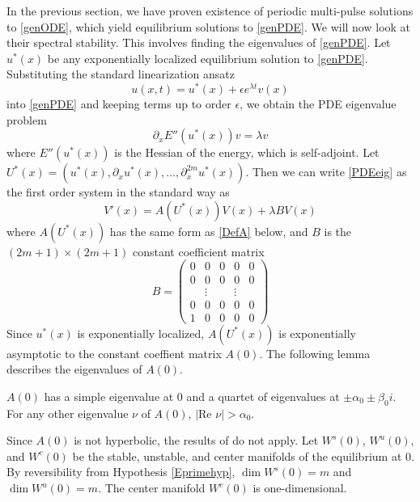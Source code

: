 \documentclass[thesis.tex]{subfiles}
\begin{document}
In the previous section, we have proven existence of periodic multi-pulse solutions to \eqref{genODE}, which yield equilibrium solutions to \eqref{genPDE}. We will now look at their spectral stability. This involves finding the eigenvalues of \eqref{genPDE}. Let $u^*(x)$ be any exponentially localized equilibrium solution to \eqref{genPDE}. Substituting the standard linearization ansatz 
\[
u(x, t) = u^*(x) + \epsilon e^{\lambda t}v(x)
\]
into \eqref{genPDE} and keeping terms up to order $\epsilon$, we obtain the PDE eigenvalue problem
\begin{equation}\label{PDEeig}
\partial_x E''(u^*(x)) v = \lambda v
\end{equation}
where $E''(u^*(x))$ is the Hessian of the energy, which is self-adjoint.  Let $U^*(x) = (u^*(x), \partial_x u^*(x), \dots, \partial_x^{2m}u^*(x))$. Then we can write \eqref{PDEeig} as the first order system in the standard way as
\begin{equation}\label{PDEeig2}
V'(x) = A(U^*(x))V(x) + \lambda B V(x)
\end{equation}
where $A(U^*(x))$ has the same form as \eqref{DefA} below, and $B$ is the $(2m+1) \times (2m+1)$ constant coefficient matrix
\begin{equation}\label{DefB}
B = \begin{pmatrix}0 & 0 & 0 & 0 & 0 \\0 & 0 & 0 & 0 & 0 \\  & 
\vdots & & \vdots & \\0 & 0 & 0 & 0 & 0 \\1 & 0 & 0 & 0 & 0 \end{pmatrix} 
\end{equation}
Since $u^*(x)$ is exponentially localized, $A(U^*(x))$ is exponentially asymptotic to the constant coeffient matrix $A(0)$. The following lemma describes the eigenvalues of $A(0)$.

\begin{lemma}\label{eigA0lemma}
$A(0)$ has a simple eigenvalue at 0 and a quartet of eigenvalues at $\pm \alpha_0 \pm \beta_0 i$. For any other eigenvalue $\nu$ of $A(0)$, $|\text{Re }\nu| > \alpha_0$. 
\end{lemma}

Since $A(0)$ is not hyperbolic, the results of \cite{Sandstede1998} do not apply. Let $W^s(0)$, $W^u(0)$, and $W^c(0)$ be the stable, unstable, and center manifolds of the equilibrium at 0. By reversibility from Hypothesis \ref{Eprimehyp}, $\dim W^s(0) = m$ and $\dim W^u(0) = m$. The center manifold $W^c(0)$ is one-dimensional.
\end{document}
